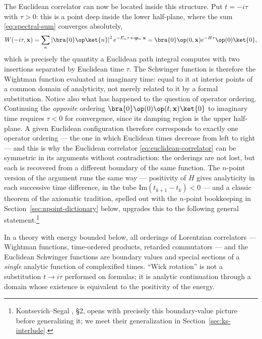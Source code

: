 The Euclidean correlator can now be located inside this structure. Put $t =
-i\tau$ with
$\tau > 0$: this is a point deep inside the lower half-plane, where the sum
\eqref{eq:spectral-sum} converges absolutely,
\begin{equation}
W(-i\tau, \mathbf{x}) = \sum_n \left|\bra{0}\op\ket{n}\right|^2
   e^{-E_n \tau + i \mathbf{p}_n\cdot\mathbf{x}}
= \bra{0}\op(0,\mathbf{x}) e^{-H\tau} \op(0)\ket{0},
\end{equation}
which is precisely the quantity a Euclidean path integral computes with two
insertions separated by Euclidean time $\tau$. The Schwinger function is
therefore the Wightman function evaluated at imaginary time: equal to it at
interior points of a common domain of analyticity, not merely related to it
by a formal substitution. Notice also what has happened to the question of
operator ordering. Continuing the \emph{opposite} ordering
$\bra{0}\op(0)\op(t,\mathbf{x})\ket{0}$ to imaginary time requires $\tau < 0$
for convergence, since its damping region is the upper half-plane. A given
Euclidean configuration therefore corresponds to exactly one operator
ordering --- the one in which Euclidean times decrease from left to right ---
and this is why the Euclidean correlator
\eqref{eq:euclidean-correlator} can be symmetric in its arguments without
contradiction: the orderings are not lost, but each is recovered from a
different boundary of the same function. The $n$-point version of the
argument runs the same way --- positivity of $H$ gives analyticity in each
successive time difference, in the tube $\mathrm{Im}(t_{k+1} - t_k) < 0$ ---
and a classic theorem of the axiomatic tradition, spelled out with the
$n$-point bookkeeping in Section~\ref{sec:npoint-dictionary} below, upgrades
this to the following general statement.\footnote{%
Kontsevich--Segal , \S2, opens with precisely this
boundary-value picture before generalizing it; we meet their generalization
in Section~\ref{sec:ks-interlude}.}

\begin{iidea}
\label{idea:one-function}
In a theory with energy bounded below, all orderings of Lorentzian correlators
--- Wightman functions, time-ordered products, retarded commutators --- and the
Euclidean Schwinger functions are boundary values and special sections of a
\emph{single} analytic function of complexified times. ``Wick rotation'' is not
a substitution $t \to i\tau$ performed on formulas; it is analytic continuation
through a domain whose existence is equivalent to the positivity of the energy.
\end{iidea}

